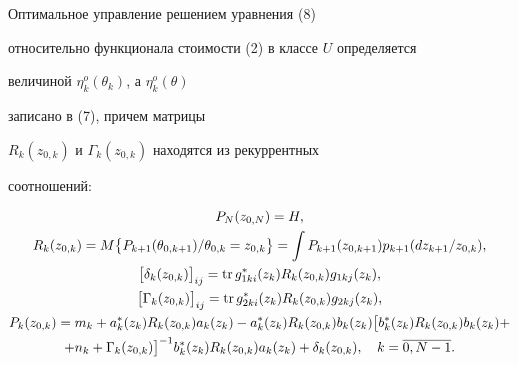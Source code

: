\begin{cor} Оптимальное управление решением уравнения (8)


относительно функционала стоимости (2) в классе $U$ определяется


величиной $\eta^{o}_{k}(\theta_{k})$, а $\eta^{o}_{k}(\theta)$


записано в (7), причем матрицы


$R_{k}(z_{0,k})$ и $\Gamma_{k}(z_{0,k})$ находятся из рекуррентных


соотношений:


\begin{gather*}


P_{N}(z_{0,N})=H,\\


%


R_{k}(z_{0,k})=M\bigl\{P_{k+1}(\theta_{0,k+1})/\theta_{0,k}=z_{0,k}


\bigr\}=


\int P_{k+1}(z_{0,k+1})p_{k+1}(dz_{k+1}/z_{0,k}),\\


%


\bigl[\delta_{k}(z_{0,k})\bigr]_{ij}=\tr g_{1ki}^{*}(z_{k})R_{k}(z_{0,k})


g_{1kj}(z_{k}),\\


%


\bigl[\Gamma_{k}(z_{0,k})\bigr]_{ij}=\tr g_{2ki}^{*}(z_{k})R_{k}(z_{0,k})


g_{2kj}(z_{k}),\\


%


P_{k}(z_{0,k})=m_{k}+


a_{k}^{*}(z_{k})R_{k}(z_{0,k})a_{k}(z_{k})-


a_{k}^{*}(z_{k})R_{k}(z_{0,k})


b_{k}(z_{k})


\bigl[b_{k}^{*}(z_{k})R_{k}(z_{0,k})


b_{k}(z_{k})+\\


+n_{k}+\Gamma_{k}(z_{0,k})\bigr]^{-1}


b_{k}^{*}(z_{k})R_{k}(z_{0,k})


a_{k}(z_{k})+\delta_{k}(z_{0,k}),\quad k=\overline{0,N-1}.


\end{gather*}


\end{cor}





